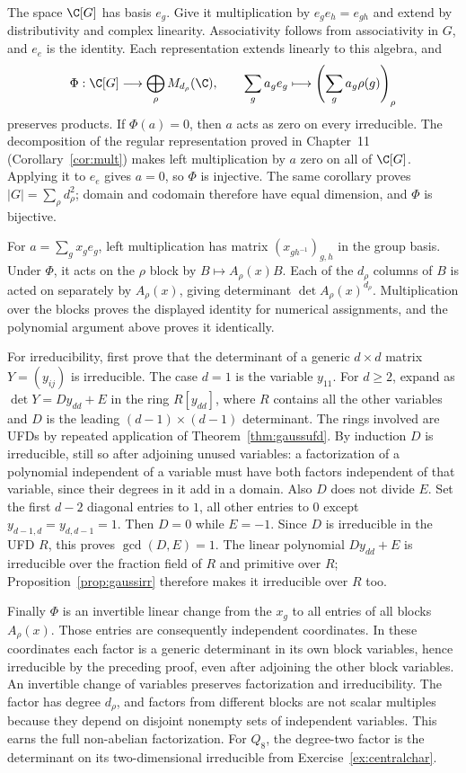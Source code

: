 The space $\C[G]$ has basis $e_g$. Give it multiplication by
$e_g e_h=e_{gh}$ and extend by distributivity and complex linearity.
Associativity follows from associativity in $G$, and $e_e$ is the identity.
Each representation extends linearly to this algebra, and
\[
\Phi:\C[G]\longrightarrow\bigoplus_\rho M_{d_\rho}(\C),\qquad
\sum_g a_g e_g\longmapsto
\left(\sum_g a_g\rho(g)\right)_\rho
\]
preserves products. If $\Phi(a)=0$, then $a$ acts as zero on every
irreducible. The decomposition of the regular representation proved in
Chapter~11 (Corollary~\ref{cor:mult}) makes left multiplication by $a$ zero
on all of $\C[G]$. Applying it to $e_e$ gives $a=0$, so $\Phi$ is injective.
The same corollary proves $|G|=\sum_\rho d_\rho^2$; domain and codomain
therefore have equal dimension, and $\Phi$ is bijective.

For $a=\sum_g x_g e_g$, left multiplication has matrix
$(x_{gh^{-1}})_{g,h}$ in the group basis. Under $\Phi$, it acts on the
$\rho$ block by $B\mapsto A_\rho(x)B$. Each of the $d_\rho$ columns of $B$
is acted on separately by $A_\rho(x)$, giving determinant
$\det A_\rho(x)^{d_\rho}$. Multiplication over the blocks proves the
displayed identity for numerical assignments, and the polynomial argument
above proves it identically.

For irreducibility, first prove that the determinant of a generic $d\times d$
matrix $Y=(y_{ij})$ is irreducible. The case $d=1$ is the variable $y_{11}$.
For $d\ge2$, expand as
$\det Y=D y_{dd}+E$ in the ring $R[y_{dd}]$, where $R$ contains all the
other variables and $D$ is the leading $(d-1)\times(d-1)$ determinant.
The rings involved are UFDs by repeated application of
Theorem~\ref{thm:gaussufd}. By induction $D$ is irreducible, still so after
adjoining unused variables: a factorization of a polynomial independent of
a variable must have both factors independent of that variable, since their
degrees in it add in a domain. Also $D$ does not divide $E$. Set the first
$d-2$ diagonal entries to $1$, all other entries to $0$ except
$y_{d-1,d}=y_{d,d-1}=1$. Then $D=0$ while $E=-1$.
Since $D$ is irreducible in the UFD $R$, this proves $\gcd(D,E)=1$.
The linear polynomial $D y_{dd}+E$ is irreducible over the fraction field
of $R$ and primitive over $R$; Proposition~\ref{prop:gaussirr} therefore
makes it irreducible over $R$ too.

Finally $\Phi$ is an invertible linear change from the $x_g$ to all entries
of all blocks $A_\rho(x)$. Those entries are consequently independent
coordinates. In these coordinates each factor is a generic determinant in
its own block variables, hence irreducible by the preceding proof, even
after adjoining the other block variables. An invertible change of variables
preserves factorization and irreducibility. The factor has degree $d_\rho$,
and factors from different blocks are not scalar multiples because they
depend on disjoint nonempty sets of independent variables. This earns the
full non-abelian factorization. For $Q_8$, the degree-two factor is the
determinant on its two-dimensional irreducible from Exercise~\ref{ex:centralchar}.

